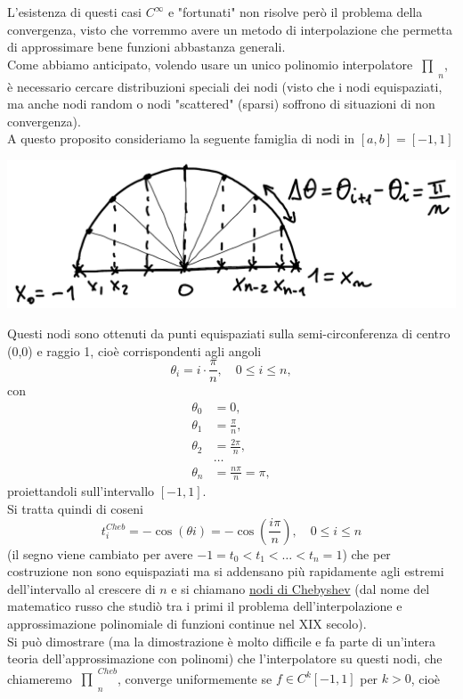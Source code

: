 \documentclass[12pt]{article}
\newcommand{\inter}{\begin{matrix}\prod\end{matrix}}
\begin{document}
L'esistenza di questi casi $C^{\infty}$ e "fortunati" non risolve però il problema della convergenza, visto che vorremmo avere un metodo di interpolazione che permetta di approssimare bene funzioni abbastanza generali.\\
Come abbiamo anticipato, volendo usare un unico polinomio interpolatore $\inter_n$, è necessario cercare distribuzioni speciali dei nodi (visto che i nodi equispaziati, ma anche nodi random o nodi "scattered" (sparsi) soffrono di situazioni di non convergenza).\\
A questo proposito consideriamo la seguente famiglia di nodi in $[a,b]=[-1,1]$
\begin{center}
    \includegraphics[scale=0.5]{pag-16.png}
\end{center}
Questi nodi sono ottenuti da punti equispaziati sulla semi-circonferenza di centro (0,0) e raggio 1, cioè corrispondenti agli angoli 
\[\theta_i=i\cdot \frac{\pi}{n}, \quad 0\leq i\leq n,\] 
con 
\[\begin{split}
    \theta_0 & = 0, \\
    \theta_1 & = \frac{\pi}{n}, \\
    \theta_2 & = \frac{2\pi}{n}, \\
    & \dotso \\
    \theta_n & = \frac{n\pi}{n}=\pi,
\end{split}\]
 proiettandoli sull'intervallo $[-1,1]$.\\ 
 Si tratta quindi di coseni 
\[ t_i^{Cheb}=-\cos(\theta i)=-\cos\left(\frac{i\pi}{n}\right),\quad 0\leq i\leq n \]
(il segno viene cambiato per avere $-1=t_0< t_1<\dotso<t_n=1$) che per costruzione non sono equispaziati ma si addensano  più rapidamente agli estremi dell'intervallo al crescere di $n$ e si chiamano \underline{nodi di Chebyshev} (dal nome del matematico russo che studiò tra i primi il problema dell'interpolazione e approssimazione polinomiale di funzioni continue nel XIX secolo).\\ 
Si può dimostrare (ma la dimostrazione è molto difficile e fa parte di un'intera teoria dell'approssimazione con polinomi) che l'interpolatore su questi nodi, che chiameremo $\inter_n^{Cheb}$, converge uniformemente se $f\in C^k[-1,1]$ per $k>0$, cioè
\end{document}
